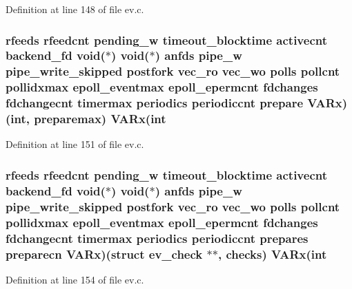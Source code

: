 \-Definition at line 148 of file ev.\-c.

\hypertarget{structev__loop_a5890978e311cf2a6669720c5aa63aa88}{
\subsubsection[{\-V\-A\-Rx}]{ {\bf rfeeds} {\bf rfeedcnt} {\bf pending\-\_\-w} {\bf timeout\-\_\-blocktime} {\bf activecnt} {\bf backend\-\_\-fd} void($\ast$) void($\ast$) {\bf anfds} {\bf pipe\-\_\-w} {\bf pipe\-\_\-write\-\_\-skipped} {\bf postfork} {\bf vec\-\_\-ro} {\bf vec\-\_\-wo} {\bf polls} {\bf pollcnt} {\bf pollidxmax} {\bf epoll\-\_\-eventmax} {\bf epoll\-\_\-epermcnt} {\bf fdchanges} {\bf fdchangecnt} {\bf timermax} {\bf periodics} {\bf periodiccnt} prepare {\bf \-V\-A\-Rx})(int, {\bf preparemax}) {\bf \-V\-A\-Rx}(int}}\label{structev__loop_a5890978e311cf2a6669720c5aa63aa88}


\-Definition at line 151 of file ev.\-c.

\hypertarget{structev__loop_a0a8efa0251632636e727ce578ef6269a}{
\subsubsection[{\-V\-A\-Rx}]{ {\bf rfeeds} {\bf rfeedcnt} {\bf pending\-\_\-w} {\bf timeout\-\_\-blocktime} {\bf activecnt} {\bf backend\-\_\-fd} void($\ast$) void($\ast$) {\bf anfds} {\bf pipe\-\_\-w} {\bf pipe\-\_\-write\-\_\-skipped} {\bf postfork} {\bf vec\-\_\-ro} {\bf vec\-\_\-wo} {\bf polls} {\bf pollcnt} {\bf pollidxmax} {\bf epoll\-\_\-eventmax} {\bf epoll\-\_\-epermcnt} {\bf fdchanges} {\bf fdchangecnt} {\bf timermax} {\bf periodics} {\bf periodiccnt} {\bf prepares} preparecn {\bf \-V\-A\-Rx})(struct {\bf ev\-\_\-check} $\ast$$\ast$, {\bf checks}) {\bf \-V\-A\-Rx}(int}}\label{structev__loop_a0a8efa0251632636e727ce578ef6269a}


\-Definition at line 154 of file ev.\-c.

